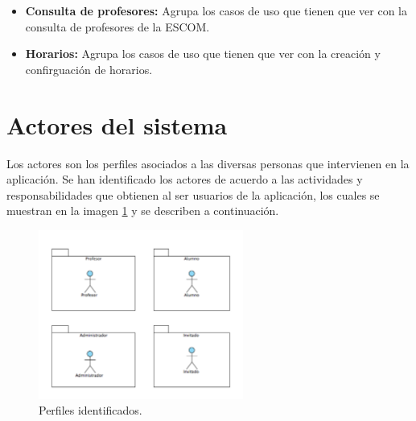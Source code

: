     \begin{itemize}
	\item {\bf Consulta de profesores:} Agrupa los casos de uso que tienen que ver con la consulta de profesores de la ESCOM. 

	
	\item {\bf Horarios:} Agrupa los casos de uso que tienen que ver con la creación y confirguación de horarios.
%	
    \end{itemize}

\section{Actores del sistema}\label{sec:Comportamiento:ActoresSistema}

Los actores son los perfiles asociados a las diversas personas que intervienen en la aplicación. Se han identificado los actores de acuerdo a las actividades y responsabilidades que obtienen al ser usuarios de la aplicación, los cuales se muestran en la imagen \ref{fig:perfilesPAEAR} y se describen a continuación.

    \begin{figure}[h!]
      \begin{center}
	  \includegraphics[width=0.6\textwidth]{images/Diagrama_Actores}
      \caption{Perfiles identificados.}
      \label{fig:perfilesPAEAR}
      \end{center}
    \end{figure}

